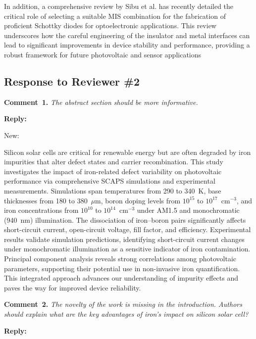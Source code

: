 \documentclass[a4paper,fleqn]{cas-sc}
\begin{document}
In addition, a comprehensive review by Sibu et al. has recently detailed the critical role of selecting a suitable MIS combination for the fabrication of proficient Schottky diodes for optoelectronic applications. This review underscores how the careful engineering of the insulator and metal interfaces can lead to significant improvements in device stability and performance, providing a robust framework for future photovoltaic and sensor applications 



\subsection*{Response to Reviewer \#2 }

\noindent
\textcolor[rgb]{0.00,0.50,1.00}{\textbf{Comment~1.}}
\emph{The abstract section should be more informative.}

\noindent
\textcolor[rgb]{0.51,0.00,0.00}{\textbf{Reply:}}

New:

Silicon solar cells are critical for renewable energy but are often degraded by iron impurities that alter defect states and carrier recombination. This study investigates the impact of iron-related defect variability on photovoltaic performance via comprehensive SCAPS simulations and experimental measurements. Simulations span temperatures from 290 to 340~K, base thicknesses from 180 to 380~$\mu$m, boron doping levels from $10^{15}$ to $10^{17}$~cm$^{-3}$, and iron concentrations from $10^{10}$ to $10^{14}$~cm$^{-3}$ under AM1.5 and monochromatic (940~nm) illumination. The dissociation of iron–boron pairs significantly affects short-circuit current, open-circuit voltage, fill factor, and efficiency. Experimental results validate simulation predictions, identifying short-circuit current changes under monochromatic illumination as a sensitive indicator of iron contamination. Principal component analysis reveals strong correlations among photovoltaic parameters, supporting their potential use in non-invasive iron quantification. This integrated approach advances our understanding of impurity effects and paves the way for improved device reliability.


\noindent
\textcolor[rgb]{0.00,0.50,1.00}{\textbf{Comment~2.}}
\emph{The novelty of the work is missing in the introduction. Authors should explain what are the key advantages of iron's impact on silicon solar cell?}

\noindent
\textcolor[rgb]{0.51,0.00,0.00}{\textbf{Reply:}}
\end{document}
